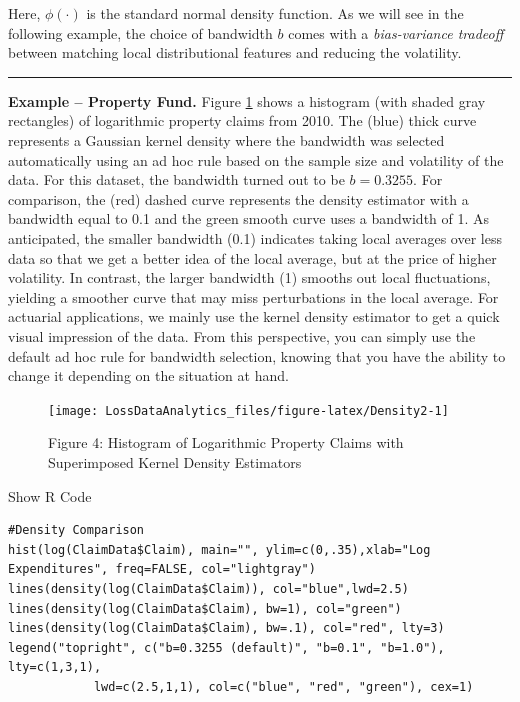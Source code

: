 \documentclass[]{book}
\theoremstyle{definition}
\theoremstyle{definition}
\theoremstyle{definition}
\theoremstyle{remark}
\begin{document}
Here, \(\phi(\cdot)\) is the standard normal density function. As we
will see in the following example, the choice of bandwidth \(b\) comes
with a \emph{bias-variance tradeoff} between matching local
distributional features and reducing the volatility.

\begin{center}\rule{0.5\linewidth}{\linethickness}\end{center}

\textbf{Example -- Property Fund.} Figure \ref{fig:Density2} shows a
histogram (with shaded gray rectangles) of logarithmic property claims
from 2010. The (blue) thick curve represents a Gaussian kernel density
where the bandwidth was selected automatically using an ad hoc rule
based on the sample size and volatility of the data. For this dataset,
the bandwidth turned out to be \(b=0.3255\). For comparison, the (red)
dashed curve represents the density estimator with a bandwidth equal to
0.1 and the green smooth curve uses a bandwidth of 1. As anticipated,
the smaller bandwidth (0.1) indicates taking local averages over less
data so that we get a better idea of the local average, but at the price
of higher volatility. In contrast, the larger bandwidth (1) smooths out
local fluctuations, yielding a smoother curve that may miss
perturbations in the local average. For actuarial applications, we
mainly use the kernel density estimator to get a quick visual impression
of the data. From this perspective, you can simply use the default ad
hoc rule for bandwidth selection, knowing that you have the ability to
change it depending on the situation at hand.

\begin{figure}

{\centering \texttt{[image: LossDataAnalytics\_files/figure-latex/Density2-1]} 

}

\caption{Figure 4: Histogram of Logarithmic Property Claims with Superimposed Kernel Density Estimators}\label{fig:Density2}
\end{figure}

Show R Code

\hypertarget{togglekpdf}{}
\begin{verbatim}
#Density Comparison
hist(log(ClaimData$Claim), main="", ylim=c(0,.35),xlab="Log Expenditures", freq=FALSE, col="lightgray")
lines(density(log(ClaimData$Claim)), col="blue",lwd=2.5)
lines(density(log(ClaimData$Claim), bw=1), col="green")
lines(density(log(ClaimData$Claim), bw=.1), col="red", lty=3)
legend("topright", c("b=0.3255 (default)", "b=0.1", "b=1.0"), lty=c(1,3,1),
            lwd=c(2.5,1,1), col=c("blue", "red", "green"), cex=1)
\end{verbatim}
\end{document}
